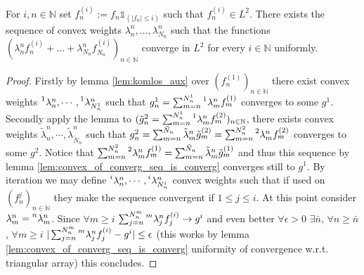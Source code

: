 \begin{lemma}\label{lem:komlos_convex_aux}
  For $i,n\in\mathbb{N}$ set $f_{n}^{(i)}:=f_n \mathbb{1}_{(|f_n|\leq i)}$ such that $f_{n}^{(i)}\in L^2$.
  There exists the sequence of convex weights $\lambda_n^{n}, \ldots, \lambda_{N_n}^{n}$ such that the functions
  $ (\lambda_n^{n} f_n^{(i)} + \ldots+\lambda_{N_n}^{n} f_{N_n}^{(i)})_{n\in\mathbb{N}}$
  converge in $L^2$ for every $i\in\mathbb{N}$ uniformly.
\end{lemma}
\begin{proof}
  Firstly by lemma \ref{lem:komlos_aux} over $(f_n^{(1)})_{n\in\mathbb{N}}$ there exist convex weights $\prescript{1}{}{\lambda}^n_n,\cdots,\prescript{1}{}{\lambda}^n_{N^1_n}$ such that
  $g^1_n=\sum_{m=n}^{N^1_n}\prescript{1}{}{\lambda}^n_mf_m^{(1)}$ converges to some $g^1$.
  Secondly apply the lemma to $(\tilde{g}^2_n=\sum_{m=n}^{N^1_n}\prescript{1}{}{\lambda}^n_mf^{(2)}_m)_{n\in\mathbb{N}}$, there exists convex weights $\tilde{\lambda}^n_n,\cdots,\tilde{\lambda}^n_{\tilde{N}_n}$ such that
  $g^2_n=\sum_{m=n}^{\tilde{N}_n}\tilde{\lambda}^n_m\tilde{g}_m^{(2)}=\sum_{m=n}^{N^2_n}\prescript{2}{}{\lambda}^n_mf_m^{(2)}$ converges to some $g^2$.
  Notice that $\sum_{m=n}^{N^2_n}\prescript{2}{}{\lambda}^n_mf_m^{(1)}=\sum_{m=n}^{\tilde{N}_n}\tilde{\lambda}^n_m\tilde{g}_m^{(1)}$ and thus this sequence by lemma \ref{lem:convex_of_converg_seq_is_converg} converges still to $g^1$.
  By iteration we may define $\prescript{i}{}{\lambda}^n_n,\cdots,\prescript{i}{}{\lambda}^n_{N^i_n}$ convex weights such that if used on $(f^j_n)_{n\in\mathbb{N}}$ they make the sequence convergent if $1\leq j\leq i$.
  At this point consider $\lambda^n_m=\prescript{n}{}{\lambda}^n_m$.
  Since $\forall m\geq i$ $\sum_{j=n}^{N^m_n}\prescript{m}{}{\lambda}^n_j f^{(i)}_j\rightarrow g^i$ and even better
  $\forall\epsilon>0$ $\exists\bar{n}$, $\forall n\geq\bar{n}$, $\forall m\geq i$ $|\sum_{j=n}^{N^m_n}\prescript{m}{}{\lambda}^n_j f^{(i)}_j - g^i|\leq\epsilon$
  (this works by lemma \ref{lem:convex_of_converg_seq_is_converg} uniformity of convergence w.r.t. triangular array) this concludes.
\end{proof}

